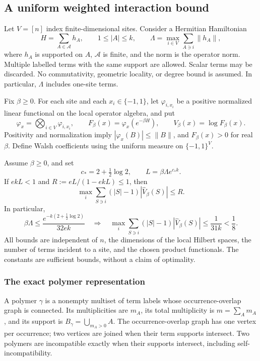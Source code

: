\subsection{A uniform weighted interaction bound}
\label{quantum-clusters:effective}

Let \(V=[n]\) index finite-dimensional sites.  Consider a Hermitian
Hamiltonian
\[
 H=\sum_{A\in\mathcal A}h_A,\qquad
 1\le |A|\le k,\qquad
 \Lambda=\max_{i\in V}\sum_{A\ni i}\|h_A\|,
 \tag{QH}
\]
where \(h_A\) is supported on \(A\), \(\mathcal A\) is finite, and the
norm is the operator norm.  Multiple labelled terms with the same
support are allowed.  Scalar terms may be discarded.  No commutativity,
geometric locality, or degree bound is assumed.  In particular,
\(\Lambda\) includes one-site terms.

Fix \(\beta\ge0\).  For each site and each \(x_i\in\{-1,1\}\), let \(\varphi_{i,x_i}\)
be a positive normalized linear functional on the local operator
algebra, and put
\[
 \varphi_x=\bigotimes_{i\in V}\varphi_{i,x_i},\qquad
 F_\beta(x)=\varphi_x(e^{-\beta H}),\qquad
 V_\beta(x)=\log F_\beta(x).
\]
Positivity and normalization imply \(|\varphi_x(B)|\le\|B\|\),
and \(F_\beta(x)>0\) for real \(\beta\).  Define Walsh coefficients
using the uniform measure on \(\{-1,1\}^V\).

\begin{theorem}
\label{thm:quantum-clusters-potential}
Assume $\beta\ge0$, and set
\[
 c_* = 2+\tfrac12\log 2,
 \qquad L=\beta\Lambda e^{c_* k}.
\]
If \(e k L<1\) and
\(R:=eL/(1-ekL)\le1\), then
\[
 \max_i\sum_{S\ni i}(|S|-1)
       |\widehat V_\beta(S)|\le R.
 \tag{QW}
\]
In particular,
\[
 \boxed{\quad
 \beta\Lambda\le
 \frac{e^{-k(2+\frac12\log2)}}{32ek}
 \quad\Longrightarrow\quad
 \max_i\sum_{S\ni i}(|S|-1)
       |\widehat V_\beta(S)|\le\frac1{31k}<\frac18.
 \quad}
 \tag{QT}
\]
All bounds are independent of \(n\), the dimensions of the local
Hilbert spaces, the number of terms incident to a site, and the chosen
product functionals.  The constants are sufficient bounds, without a
claim of optimality.
\end{theorem}

\subsubsection{The exact polymer representation}

A polymer \(\gamma\) is a nonempty multiset of term labels whose
occurrence-overlap graph is connected.  Its multiplicities are
\(m_A\), its total multiplicity is \(m=\sum_A m_A\), and its support
is \(B_\gamma=\bigcup_{m_A>0}A\).  The occurrence-overlap graph has
one vertex per occurrence; two vertices are joined when their term
supports intersect.  Two polymers are incompatible exactly when their
supports intersect, including self-incompatibility.

